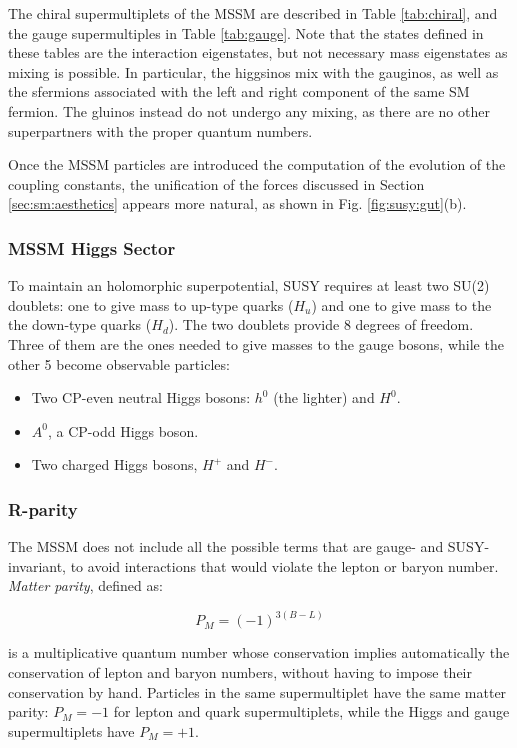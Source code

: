The chiral supermultiplets of the MSSM are described in Table \ref{tab:chiral}, and the gauge supermultiples in Table \ref{tab:gauge}. Note that the states defined in these tables are the interaction eigenstates, but not necessary mass eigenstates as mixing is possible. In particular, the higgsinos mix with the gauginos, as well as the sfermions associated with the left and right component of the same SM fermion. The gluinos instead do not undergo any mixing, as there are no other superpartners with the proper quantum numbers.

Once the MSSM particles are introduced the computation of the evolution of the coupling constants, the unification of the forces discussed in Section \ref{sec:sm:aesthetics} appears more natural, as shown in Fig. \ref{fig:susy:gut}(b).


\subsubsection{MSSM Higgs Sector}
\label{sec:susy:higgs}

To maintain an holomorphic superpotential, SUSY requires at least two SU(2) doublets: one to give mass to up-type quarks ($H_u$) and one to give mass to the the down-type quarks ($H_d$). The two doublets provide 8 degrees of freedom. Three of them are the ones needed to give masses to the gauge bosons, while the other 5 become observable particles:
\begin{itemize}
\item Two CP-even neutral Higgs bosons: $h^0$ (the lighter) and $H^0$.
\item $A^0$, a CP-odd Higgs boson.
\item Two charged Higgs bosons, $H^+$ and $H^-$.
\end{itemize}


\subsubsection{R-parity}

The MSSM does not include all the possible terms that are gauge- and SUSY-invariant, to avoid interactions that would violate the lepton or baryon number. \textit{Matter parity}, defined as:

\begin{equation}
P_M = (-1)^{3 (B-L)} 
\label{eq:defmatterparity}
\end{equation}

is a multiplicative quantum number whose conservation implies automatically the conservation of lepton and baryon numbers, without having to impose their conservation by hand. Particles in the same supermultiplet have the same matter parity: $P_M =-1$ for lepton and quark supermultiplets, while the Higgs and gauge supermultiplets have $P_M =+1$.

